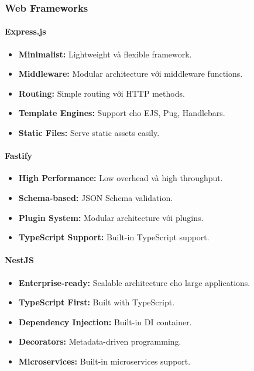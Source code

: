 \documentclass[a4paper,12pt]{report}
\begin{document}
\subsubsection{Web Frameworks}

\paragraph{Express.js}
\begin{itemize}
    \item \textbf{Minimalist:} Lightweight và flexible framework.
    \item \textbf{Middleware:} Modular architecture với middleware functions.
    \item \textbf{Routing:} Simple routing với HTTP methods.
    \item \textbf{Template Engines:} Support cho EJS, Pug, Handlebars.
    \item \textbf{Static Files:} Serve static assets easily.
\end{itemize}

\paragraph{Fastify}
\begin{itemize}
    \item \textbf{High Performance:} Low overhead và high throughput.
    \item \textbf{Schema-based:} JSON Schema validation.
    \item \textbf{Plugin System:} Modular architecture với plugins.
    \item \textbf{TypeScript Support:} Built-in TypeScript support.
\end{itemize}

\paragraph{NestJS}
\begin{itemize}
    \item \textbf{Enterprise-ready:} Scalable architecture cho large applications.
    \item \textbf{TypeScript First:} Built with TypeScript.
    \item \textbf{Dependency Injection:} Built-in DI container.
    \item \textbf{Decorators:} Metadata-driven programming.
    \item \textbf{Microservices:} Built-in microservices support.
\end{itemize}
\end{document}
